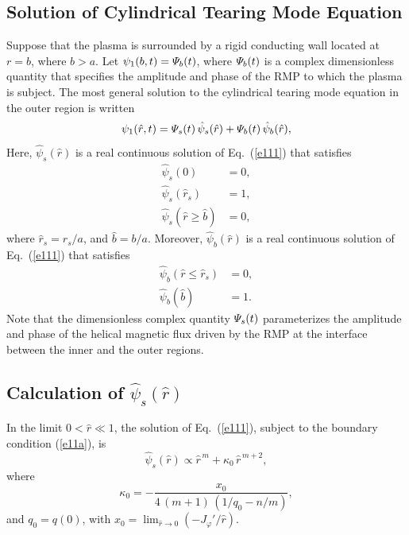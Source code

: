 \documentclass[12pt,prb,aps]{revtex4-1}
\begin{document}
\subsection{Solution of Cylindrical Tearing Mode Equation}\label{scly}
Suppose that the plasma is surrounded by a rigid conducting wall located at $r=b$, where $b>a$. 
Let $\psi_1(b,t) = {\mit\Psi}_b(t)$, where ${\mit\Psi}_b(t)$ is a complex dimensionless quantity that specifies the amplitude and phase of the
RMP to which the plasma is subject. The most general solution to the cylindrical tearing mode equation in the outer region is written 
\begin{equation}\label{e73}
\psi_1(\hat{r},t) = {\mit\Psi}_s(t)\,\hat\psi_s(\hat{r}) + {\mit\Psi}_b(t)\,\hat{\psi}_b(\hat{r}), 
\end{equation}
Here, $\hat{\psi}_s(\hat{r})$ is a real continuous solution of Eq.~(\ref{e111}) that satisfies 
\begin{align}
\hat{\psi}_s(0) &= 0,\label{e11a}\\[0.5ex]
\hat{\psi}_s(\hat{r}_s)&= 1,\label{e12a}\\[0.5ex]
\hat{\psi}_s(\hat{r}\geq \hat{b}) &= 0,\label{e13a}
\end{align}
where $\hat{r}_s=r_s/a$, and $\hat{b}= b/a$. 
Moreover, $\hat{\psi}_b(\hat{r})$ is a real continuous solution of Eq.~(\ref{e111}) that satisfies
\begin{align}
\hat{\psi}_b(\hat{r}\leq \hat{r}_s) &= 0,\\[0.5ex]
\hat{\psi}_b(\hat{b})&= 1.\label{e109}
\end{align}
Note that the dimensionless complex quantity ${\mit\Psi}_s(t)$ parameterizes the amplitude and phase  of the
helical magnetic flux driven  by the RMP at the interface between the inner and the outer regions.

\subsection{Calculation of $\hat{\psi}_s(\hat{r})$}\label{psis}
In the limit $0<\hat{r}\ll 1$, the solution of Eq.~(\ref{e111}), subject to the boundary condition (\ref{e11a}), is 
\begin{equation}\label{e81}
\hat{\psi}_s(\hat{r})\propto \hat{r}^{\,m} + \kappa_0\,\hat{r}^{\,m+2},
\end{equation}
where 
\begin{equation}
\kappa_0 = - \frac{x_0}{4\,(m+1)\,(1/q_0-n/m)},
\end{equation}
 and $q_0=q(0)$, with $x_0=\lim_{\hat{r}\rightarrow 0}(-J_\varphi'/\hat{r})$. 
\end{document}

